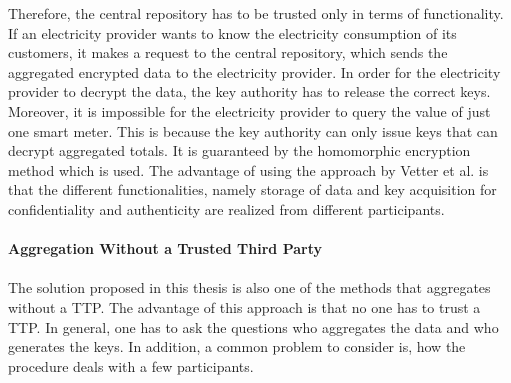 Therefore, the central repository has to be trusted only in terms of functionality. If an electricity provider wants to know the electricity consumption of its customers, it makes a request to the central repository, which sends the aggregated encrypted data to the electricity provider. In order for the electricity provider to decrypt the data, the key authority has to release the correct keys. Moreover, it is impossible for the electricity provider to query the value of just one smart meter. This is because the key authority can only issue keys that can decrypt aggregated totals. It is guaranteed by the homomorphic encryption method which is used. The advantage of using the approach by Vetter et al. is that the different functionalities, namely storage of data and key acquisition for confidentiality and authenticity are realized from different participants.
\\
\\
\textbf{Aggregation Without a Trusted Third Party}
\label{subsec:aggegration_without_ttp}
\\
\\
The solution proposed in this thesis is also one of the methods that aggregates without a \gls{TTP}. The advantage of this approach is that no one has to trust a \gls{TTP}. In general, one has to ask the questions who aggregates the data and who generates the keys. In addition, a common problem to consider is, how the procedure deals with a few participants. \\
